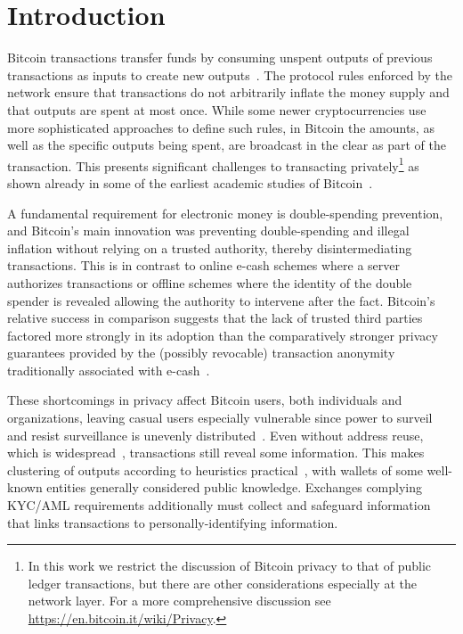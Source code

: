 \documentclass[a4paper]{article}
\begin{document}
\section{Introduction}
Bitcoin transactions transfer funds by consuming unspent outputs of previous transactions as inputs to create new outputs~\cite{nakamoto2009bitcoin}. The protocol rules enforced by the network ensure that transactions do not arbitrarily inflate the money supply and that outputs are spent at most once. While some newer cryptocurrencies use more sophisticated approaches to define such rules, in Bitcoin the amounts, as well as the specific outputs being spent, are broadcast in the clear as part of the transaction. This presents significant challenges to transacting privately\footnote{In this work we restrict the discussion of Bitcoin privacy to that of public ledger transactions, but there are other considerations especially at the network layer. For a more comprehensive discussion see \url{https://en.bitcoin.it/wiki/Privacy}.} as shown already in some of the earliest academic studies of Bitcoin~\cite{reid2013analysis,ron2013quantitative,androulaki2013evaluating,ober2013structure,moeser2013inquiry,meiklejohn2013fistful}.

A fundamental requirement for electronic money is double-spending prevention, and Bitcoin's main innovation was preventing double-spending and illegal inflation without relying on a trusted authority, thereby disintermediating transactions. This is in contrast to online e-cash schemes where a server authorizes transactions or offline schemes where the identity of the double spender is revealed allowing the authority to intervene after the fact. Bitcoin's relative success in comparison suggests that the lack of trusted third parties factored more strongly in its adoption than the comparatively stronger privacy guarantees provided by the (possibly revocable) transaction  anonymity traditionally associated with e-cash~\cite{davida1997anonymity}.

These shortcomings in privacy affect Bitcoin users, both individuals and organizations, leaving casual users especially vulnerable since power to surveil and resist surveillance is unevenly distributed~\cite{rogaway2015moral}. Even without address reuse, which is widespread~\cite{gaihre2018bitcoin}, transactions still reveal some information. This makes clustering of outputs according to heuristics practical~\cite{harrigan2016unreasonable}, with wallets of some well-known entities generally considered public knowledge. Exchanges complying KYC/AML requirements additionally must collect and safeguard information that links transactions to personally-identifying information.
\end{document}

